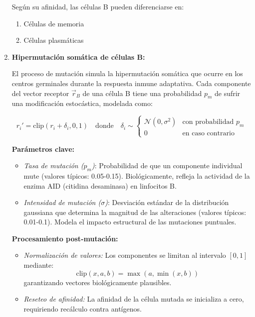\begin{enumerate}
    Según su afinidad, las células B pueden diferenciarse en:
        \begin{enumerate}
            \item Células de memoria 
            \item Células plasmáticas 
        \end{enumerate}
    \item \textbf{Hipermutación somática de células B:}

El proceso de mutación simula la hipermutación somática que ocurre en los centros germinales durante la respuesta inmune adaptativa. Cada componente del vector receptor $\vec{r}_B$ de una célula B tiene una probabilidad $p_m$ de sufrir una modificación estocástica, modelada como:

\begin{equation}
r_i' = \text{clip}\left(r_i + \delta_i, 0, 1\right) \quad \text{donde} \quad \delta_i \sim 
\begin{cases} 
\mathcal{N}(0, \sigma^2) & \text{con probabilidad } p_m \\
0 & \text{en caso contrario}
\end{cases}
\end{equation}

\noindent \textbf{Parámetros clave:}
\begin{itemize}
    \item \textit{Tasa de mutación ($p_m$)}: Probabilidad de que un componente individual mute (valores típicos: 0.05-0.15). Biológicamente, refleja la actividad de la enzima AID (citidina desaminasa) en linfocitos B.
    
    \item \textit{Intensidad de mutación ($\sigma$)}: Desviación estándar de la distribución gaussiana que determina la magnitud de las alteraciones (valores típicos: 0.01-0.1). Modela el impacto estructural de las mutaciones puntuales.
\end{itemize}

\noindent \textbf{Procesamiento post-mutación:}
\begin{itemize}
    \item \textit{Normalización de valores:} Los componentes se limitan al intervalo $[0,1]$ mediante:
    \[
    \text{clip}(x, a, b) = \max(a, \min(x, b))
    \]
    garantizando vectores biológicamente plausibles.
    
    \item \textit{Reseteo de afinidad:} La afinidad de la célula mutada se inicializa a cero, requiriendo recálculo contra antígenos.
    

\end{itemize}
\end{enumerate}
